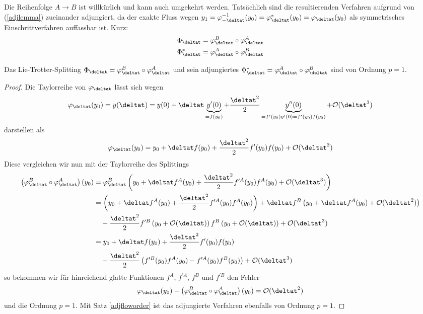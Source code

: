 \hfill%
\begin{minipage}{0.7\textwidth}
Die Reihenfolge $A\to B$ ist willkürlich und kann auch umgekehrt werden. Tatsächlich sind die resultierenden Verfahren aufgrund von (\ref{adjlemma}) zueinander adjungiert, da der exakte Fluss wegen $y_1=\varphi_{-\deltat}^{-1}(y_0)=\varphi_{\deltat}^*(y_0)=\varphi_{\deltat}(y_0)$ als symmetrisches Einschrittverfahren auffassbar ist. Kurz:\\
\begin{align}
\label{liesplittings}
\Phi_{\deltat}=\varphi_{\deltat}^B \circ \varphi_{\deltat}^A\\
\Phi_{\deltat}^*=\varphi_{\deltat}^A \circ \varphi_{\deltat}^B\nonumber
\end{align} 
\end{minipage}

\begin{maththeorem}
\label{lieorder1}
Das Lie-Trotter-Splitting $\Phi_{\deltat}=\varphi_{\deltat}^B \circ \varphi_{\deltat}^A$ und sein adjungiertes $\Phi_{\deltat}^*=\varphi_{\deltat}^A \circ \varphi_{\deltat}^B$ sind von Ordnung $p=1$.
\end{maththeorem}
\begin{proof}
Die Taylorreihe von $\varphi_{\deltat}$ lässt sich wegen 
\[\varphi_{\deltat}(y_0)=y(\deltat)=y(0)+\deltat \underbrace{y^\prime(0)}_{=f(y_0)}
+\frac{\deltat^2}{2}\underbrace{y^{\prime\prime}(0)}_{=f^\prime(y_0)y^\prime(0)=f^\prime(y_0)f(y_0)}+\mathcal{O}(\deltat^3)\] darstellen als 
\[\varphi_{\deltat}(y_0)=y_0+\deltat f(y_0)+\frac{\deltat^2}{2}f^\prime(y_0)f(y_0)+\mathcal{O}(\deltat^3)\]
Diese vergleichen wir nun mit der Taylorreihe des Splittings
\begin{align*}
\left(\varphi_{\deltat}^B \circ \varphi_{\deltat}^A\right)(y_0)&=
\varphi_{\deltat}^B\left(y_0+\deltat f^A(y_0)+\frac{\deltat^2}{2}f^{\prime A}(y_0)f^A(y_0)+\mathcal{O}(\deltat^3)\right)\\
&=\left(y_0+\deltat f^A(y_0)+\frac{\deltat^2}{2}f^{\prime A}(y_0)f^A(y_0)\right)
+\deltat f^B\left(y_0+\deltat f^A(y_0)+\mathcal{O}(\deltat^2)\right)\\
&\quad+\frac{\deltat^2}{2}f^{\prime B}\left(y_0+\mathcal{O}(\deltat)\right)f^B\left(y_0+\mathcal{O}(\deltat)\right)+\mathcal{O}(\deltat^3)\\
&=y_0+\deltat f(y_0)+\frac{\deltat^2}{2}f^\prime(y_0)f(y_0)\\
&\quad+\frac{\deltat^2}{2}\left(f^{\prime B}(y_0)f^A(y_0)-f^{\prime A}(y_0)f^B(y_0)\right)+\mathcal{O}(\deltat^3)
\end{align*}
so bekommen wir für hinreichend glatte Funktionen $f^A$, $f^{\prime A}$, $f^B$ und $f^{\prime B}$ den Fehler \[\varphi_{\deltat}(y_0)-\left(\varphi_{\deltat}^B \circ \varphi_{\deltat}^A\right)(y_0)=\mathcal{O}(\deltat^2)\] und die Ordnung $p=1$. Mit Satz \ref{adjfloworder} ist das adjungierte Verfahren ebenfalls von Ordnung $p=1$.
\end{proof}

